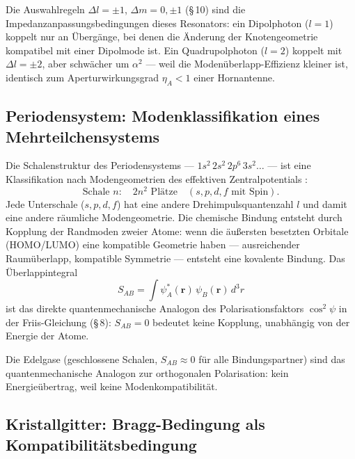 Die Auswahlregeln $\Delta l = \pm 1$, $\Delta m = 0,\pm 1$ (§\,10)
sind die Im\-pe\-danz\-an\-pas\-sungs\-be\-din\-gun\-gen dieses Resonators: ein
Dipolphoton ($l=1$) koppelt nur an Übergänge, bei denen die
Änderung der Knotengeometrie kompatibel mit einer Dipolmode ist.
Ein Quadrupolphoton ($l=2$) koppelt mit $\Delta l = \pm 2$, aber
schwächer um $\alpha^2$ --- weil die Modenüberlapp-Effizienz kleiner
ist, identisch zum Aperturwirkungsgrad $\eta_A < 1$ einer Hornantenne.

\subsection*{Periodensystem: Modenklassifikation eines Mehrteilchensystems}

Die Schalenstruktur des Periodensystems --- $1s^2\,2s^2\,2p^6\,3s^2\ldots$
--- ist eine Klassifikation nach Modengeometrien des effektiven
Zentralpotentials \EM:
\[
  \text{Schale } n: \quad 2n^2 \text{ Plätze}
  \quad (s, p, d, f \text{ mit Spin}).
\]
Jede Unterschale ($s, p, d, f$) hat eine andere Drehimpulsquantenzahl
$l$ und damit eine andere räumliche Modengeometrie. Die chemische
Bindung entsteht durch Kopplung der Randmoden zweier Atome: wenn die
äußersten besetzten Orbitale (HOMO/LUMO) eine kompatible Geometrie
haben --- ausreichender Raumüberlapp, kompatible Symmetrie --- entsteht
eine kovalente Bindung. Das Überlappintegral
\[
  S_{AB} = \int \psi_A^*(\mathbf{r})\,\psi_B(\mathbf{r})\,d^3r
\]
ist das direkte quantenmechanische Analogon des Polarisationsfaktors
$\cos^2\psi$ in der Friis-Gleichung (§\,8): $S_{AB}=0$ bedeutet
keine Kopplung, unabhängig von der Energie der Atome.

Die Edelgase (geschlossene Schalen, $S_{AB}\approx 0$ für alle
Bindungspartner) sind das quantenmechanische Analogon zur
orthogonalen Polarisation: kein Energieübertrag, weil keine
Modenkompatibilität.

\subsection*{Kristallgitter: Bragg-Bedingung als Kom\-pa\-ti\-bi\-li\-täts\-be\-din\-gung}

